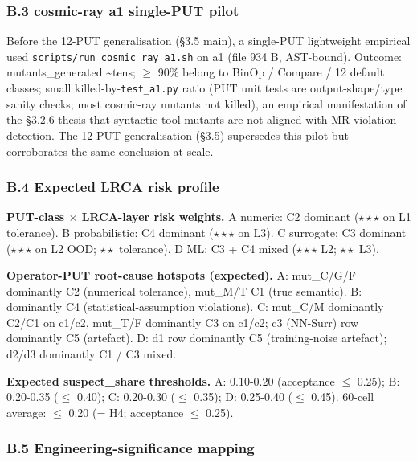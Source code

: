 \documentclass[review,12pt,authoryear]{elsarticle}
\begin{document}
\subsubsection{B.3 cosmic-ray a1 single-PUT pilot}\label{b.3-cosmic-ray-a1-single-put-pilot-pre-12-put-empirical}

Before the 12-PUT generalisation (§3.5 main), a single-PUT lightweight
empirical used \texttt{scripts/run\_cosmic\_ray\_a1.sh} on a1 (file
934 B, AST-bound). Outcome: mutants\_generated \textasciitilde tens; $\geq$
90\% belong to BinOp / Compare / 12 default classes; small
killed-by-\texttt{test\_a1.py} ratio (PUT unit tests are
output-shape/type sanity checks; most cosmic-ray mutants not killed), an
empirical manifestation of the §3.2.6 thesis that syntactic-tool mutants
are not aligned with MR-violation detection. The 12-PUT generalisation
(§3.5) supersedes this pilot but corroborates the same conclusion at
scale.

\subsubsection{B.4 Expected LRCA risk profile}\label{b.4-expected-lrca-risk-profile}

\textbf{PUT-class $\times$ LRCA-layer risk weights.} A numeric: C2 dominant
($\star\star\star$ on L1 tolerance). B probabilistic: C4 dominant ($\star\star\star$ on L3). C
surrogate: C3 dominant ($\star\star\star$ on L2 OOD; $\star\star$ tolerance). D ML: C3 + C4
mixed ($\star\star\star$ L2; $\star\star$ L3).

\textbf{Operator-PUT root-cause hotspots (expected).} A: mut\_C/G/F
dominantly C2 (numerical tolerance), mut\_M/T C1 (true semantic). B:
dominantly C4 (statistical-assumption violations). C: mut\_C/M
dominantly C2/C1 on c1/c2, mut\_T/F dominantly C3 on c1/c2; c3 (NN-Surr)
row dominantly C5 (artefact). D: d1 row dominantly C5 (training-noise
artefact); d2/d3 dominantly C1 / C3 mixed.

\textbf{Expected suspect\_share thresholds.} A: 0.10-0.20 (acceptance $\leq$
0.25); B: 0.20-0.35 ($\leq$ 0.40); C: 0.20-0.30 ($\leq$ 0.35); D: 0.25-0.40 ($\leq$
0.45). 60-cell average: $\leq$ 0.20 (= H4; acceptance $\leq$ 0.25).

\subsubsection{B.5 Engineering-significance mapping}\label{b.5-engineering-significance-mapping}
\end{document}
